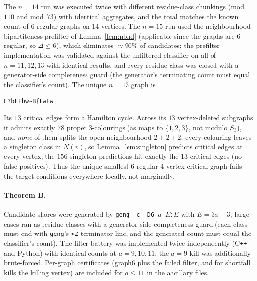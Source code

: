 \documentclass[11pt]{article}
\theoremstyle{remark}
\begin{document}
The $n=14$ run was executed twice with different residue-class chunkings
(mod~$110$ and mod~$73$) with identical aggregates, and the total matches the
known count of $6$-regular graphs on $14$ vertices. The $n=15$ run used the
neighbourhood-bipartiteness prefilter of Lemma~\ref{lem:nbhd} (applicable since the
graphs are $6$-regular, so $\Delta\le 6$), which eliminates $\approx 90\%$ of
candidates; the prefilter implementation was validated against the unfiltered
classifier on all of $n=11,12,13$ with identical results, and every residue class
was closed with a generator-side completeness guard (the generator's terminating
count must equal the classifier's count). The unique $n=13$ graph is
\begin{center}
\texttt{L?bFFbw\textasciitilde B\{FwFw}
\end{center}
Its $13$ critical edges form a Hamilton cycle. Across its $13$ vertex-deleted
subgraphs it admits exactly $78$ proper $3$-colourings (as maps to $\{1,2,3\}$,
not modulo $S_3$), and \emph{none} of them splits the open neighbourhood
$2+2+2$: every colouring leaves a singleton class in $N(v)$, so
Lemma~\ref{lem:singleton} predicts critical edges at every vertex; the $156$
singleton predictions hit exactly the $13$ critical edges (no false positives).
Thus the unique smallest $6$-regular $4$-vertex-critical graph fails the target
conditions everywhere locally, not marginally.

\paragraph{Theorem B.} Candidate shores were generated by
\texttt{geng -c -D6 $a$ $E$:$E$} with $E=3a-3$; large cases ran as residue
classes with a generator-side completeness guard (each class must end with
\texttt{geng}'s \texttt{>Z} terminator line, and the generated count must equal
the classifier's count). The filter battery was implemented twice independently
(C\texttt{++} and Python) with identical counts at $a=9,10,11$; the $a=9$ kill was
additionally brute-forced. Per-graph certificates (graph6 plus the failed filter,
and for shortfall kills the killing vertex) are included for $a\le 11$ in the
ancillary files.
\end{document}
